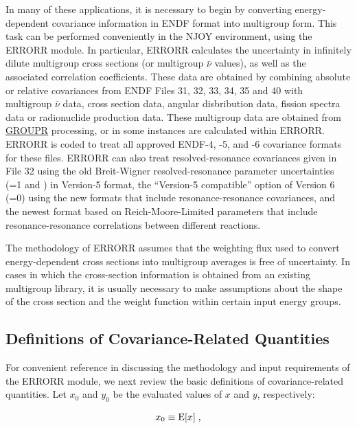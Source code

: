 In many of these applications, it is necessary to begin by converting
energy-dependent covariance information in ENDF format\cite{ENDF102}
into multigroup form.  This task can be performed conveniently in the
NJOY environment, using the ERRORR module.  In particular,
ERRORR calculates the uncertainty in infinitely dilute multigroup cross
sections (or multigroup $\bar{\nu}$ values), as well as the associated
correlation coefficients.  These data are obtained by combining
absolute or relative covariances from ENDF Files 31, 32, 33, 34, 35 and 40
with multigroup $\bar{\nu}$ data, cross section data, angular disbribution
data, fission spectra data or radionuclide production data.  These
multigroup data are obtained from \hyperlink{sGROUPRhy}{GROUPR}
processing, or in some instances are calculated
within ERRORR.  ERRORR is coded to treat all approved ENDF-4, -5, and -6
covariance formats for these files.  ERRORR can also treat
resolved-resonance covariances given in File 32 using the old
Breit-Wigner resolved-resonance parameter uncertainties (=1
and ) in Version-5 format, the ``Version-5 compatible''
option of Version 6 (=0) using the new formats
that include resonance-resonance covariances, and the newest
format based on Reich-Moore-Limited parameters that include
resonance-resonance correlations between different reactions.

The methodology of ERRORR assumes that the weighting flux
 used to convert energy-dependent cross sections
into multigroup averages is free of uncertainty.  In cases in which
the cross-section information is obtained from an existing multigroup
library, it is usually necessary to make assumptions about the shape
of the cross section and the weight function within certain input
energy groups.

\subsection{Definitions of Covariance-Related Quantities}
\label{ssERRORR_Defs}

For convenient reference in discussing the methodology and input
requirements of the ERRORR module, we next review the basic definitions
of covariance-related quantities.  Let $x_{0}$ and $y_{0}$ be the
evaluated values of $x$ and $y$, respectively:

\begin{equation}
   x_{0} \equiv {\rm E}[x] \; ,
\end{equation}

